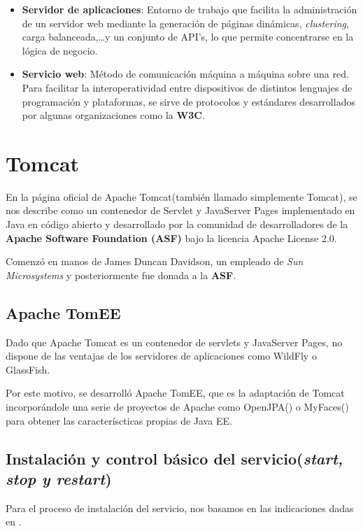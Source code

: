 \documentclass[a4paper, 10pt]{article}
\begin{document}
\begin{itemize}
		\item \textbf{Servidor de aplicaciones}: Entorno de trabajo que facilita la
		administración de un servidor web mediante la generación de páginas dinámicas,
		\textit{clustering}, carga balanceada,\dots y un conjunto de API's, lo que
		permite concentrarse en la lógica de negocio.\cite{AS_Def}

		\item \textbf{Servicio web}: Método de comunicación máquina a máquina sobre
		una red. Para facilitar la interoperatividad entre dispositivos de distintos
		lenguajes de programación y plataformas, se sirve de protocolos y estándares
		desarrollados por algunas organizaciones como la \textbf{W3C}.\cite{WS_Def}
	\end{itemize}

\section{Tomcat}
	En la página oficial de Apache Tomcat\cite{TC_official}(también llamado simplemente Tomcat),
	se nos describe como un contenedor de Servlet y JavaServer Pages implementado en Java en
	código abierto y desarrollado por la comunidad de desarrolladores de la \textbf{Apache
	Software Foundation (ASF)} bajo la licencia Apache License 2.0.
	
	Comenzó en manos de James Duncan Davidson, un empleado de \textit{Sun Microsystems} y
	posteriormente fue donada a la \textbf{ASF}.

	\subsection{Apache TomEE}
		Dado que Apache Tomcat es un contenedor de servlets y JavaServer Pages, no dispone de
		las ventajas de los servidores de aplicaciones como WildFly o GlassFish.
		
		Por este motivo, se desarrolló Apache TomEE, que es la adaptación de Tomcat
		incorporándole una serie de proyectos de Apache como OpenJPA(\cite{TC_OpenJPA}) o
		MyFaces(\cite{TC_MyFaces}) para obtener las caracteríscticas propias de Java EE.\cite{TC_TomEE}
	
	\subsection{Instalación y control básico del servicio(\textit{start, stop y restart})}
		Para el proceso de instalación del servicio, nos basamos en las indicaciones dadas en
		\cite{TC_install}.
		
\end{document}
